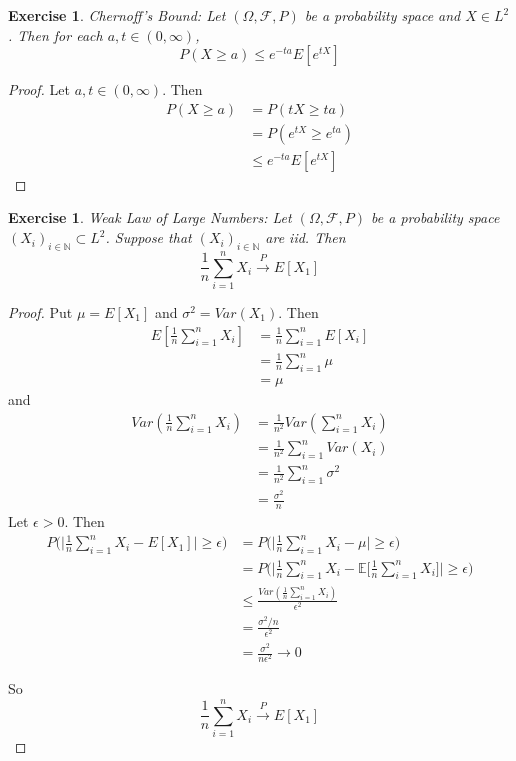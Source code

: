 \documentclass[12pt]{amsart}
\newtheorem{ex}[thm]{Exercise}
\newcommand{\ep}{\epsilon}
\newcommand{\sig}{\sigma}
\newcommand{\Om}{\Omega}
\newcommand{\N}{\mathbb{N}}
\newcommand{\E}{\mathbb{E}}
\newcommand{\MF}{\mathcal{F}}
\newcommand{\conv}[1]{\xrightarrow{#1}}
\begin{document}
\begin{ex}{Chernoff's Bound:}
Let $(\Om, \MF, P)$ be a probability space and $X \in L^2$. Then for each $a, t \in (0, \infty)$, $$P( X \geq a) \leq e^{-ta}E[e^{tX}]$$
\end{ex}

\begin{proof}
Let $a, t \in (0, \infty)$. Then 
\begin{align*}
P( X \geq a)
&= P(tX \geq ta) \\
&= P(e^{tX} \geq e^{ta}) \\
& \leq e^{-ta}E[e^{tX}]
\end{align*}
\end{proof}

\begin{ex}{Weak Law of Large Numbers:}
Let $(\Om, \MF, P)$ be a probability space $(X_i)_{i\in \N} \subset L^2$. Suppose that $(X_i)_{i\in \N}$ are iid. Then $$\frac{1}{n}\sum_{i=1}^n X_i \conv{P} E[X_1]$$
\end{ex}

\begin{proof}
Put $\mu = E[X_1]$ and $\sig^2 = Var(X_1)$. Then 
\begin{align*}
E[\frac{1}{n}\sum_{i=1}^n X_i] 
&= \frac{1}{n} \sum_{i=1}^nE[X_i] \\
&= \frac{1}{n} \sum_{i=1}^n \mu \\
&= \mu
\end{align*} and 
\begin{align*}
Var(\frac{1}{n}\sum_{i=1}^n X_i) 
&= \frac{1}{n^2} Var(\sum_{i=1}^n X_i) \\
&= \frac{1}{n^2} \sum_{i=1}^n Var(X_i) \\
&= \frac{1}{n^2} \sum_{i=1}^n \sig^2 \\
&= \frac{\sig^2}{n}
\end{align*}
Let $\ep >0$. Then 
\begin{align*}
P\bigg(\bigg \vert \frac{1}{n} \sum_{i=1}^n X_i - E[X_1] \bigg \vert \geq \ep \bigg) 
& = P\bigg(\bigg\vert \frac{1}{n} \sum_{i=1}^n X_i - \mu \bigg\vert \geq \ep\bigg) \\
& = P\bigg(\bigg\vert \frac{1}{n} \sum_{i=1}^n X_i - \E\bigg[\frac{1}{n}\sum_{i=1}^n X_i \bigg] \bigg\vert \geq \ep\bigg) \\ 
&\leq \frac{Var(\frac{1}{n} \sum_{i=1}^n X_i)}{\ep^2} \\
& =  \frac{\sig^2 / n}{\ep^2} \\
&= \frac{\sig^2}{n\ep^2} \rightarrow 0
\end{align*}

So $$\frac{1}{n}\sum_{i=1}^n X_i \conv{P} E[X_1]$$
\end{proof}
\end{document}
